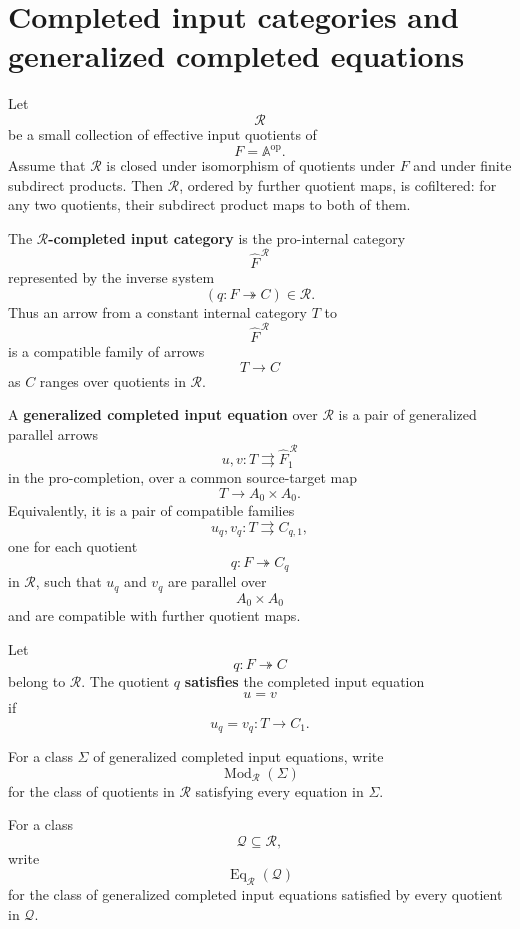 \section{Completed input categories and generalized completed equations}
\label{sec:eilenberg-completed-input-categories-equations}

Let
\[
\mathcal R
\]
be a small collection of effective input quotients of
\[
F=\mathbb A^{\mathrm{op}}.
\]
Assume that \(\mathcal R\) is closed under isomorphism of quotients under
\(F\) and under finite subdirect products. Then \(\mathcal R\), ordered by
further quotient maps, is cofiltered: for any two quotients, their subdirect
product maps to both of them.

\begin{definition}
\label{def:eilenberg-completed-input-category}
The \textbf{\(\mathcal R\)-completed input category} is the pro-internal
category
\[
\widehat F^{\,\mathcal R}
\]
represented by the inverse system
\[
(q:F\twoheadrightarrow C)\in\mathcal R.
\]
Thus an arrow from a constant internal category \(T\) to
\[
\widehat F^{\,\mathcal R}
\]
is a compatible family of arrows
\[
T\to C
\]
as \(C\) ranges over quotients in \(\mathcal R\).
\end{definition}

\begin{definition}
\label{def:eilenberg-completed-input-equation}
A \textbf{generalized completed input equation} over \(\mathcal R\) is a pair
of generalized parallel arrows
\[
u,v:T\rightrightarrows \widehat F^{\,\mathcal R}_1
\]
in the pro-completion, over a common source-target map
\[
T\to A_0\times A_0.
\]
Equivalently, it is a pair of compatible families
\[
u_q,v_q:T\rightrightarrows C_{q,1},
\]
one for each quotient
\[
q:F\twoheadrightarrow C_q
\]
in \(\mathcal R\), such that \(u_q\) and \(v_q\) are parallel over
\[
A_0\times A_0
\]
and are compatible with further quotient maps.
\end{definition}

\begin{definition}
\label{def:eilenberg-satisfaction-completed-equation}
Let
\[
q:F\twoheadrightarrow C
\]
belong to \(\mathcal R\). The quotient \(q\) \textbf{satisfies} the completed
input equation
\[
u=v
\]
if
\[
u_q=v_q:T\to C_1.
\]
\end{definition}

\begin{definition}
\label{def:eilenberg-models-equations}
For a class \(\Sigma\) of generalized completed input equations, write
\[
\operatorname{Mod}_{\mathcal R}(\Sigma)
\]
for the class of quotients in \(\mathcal R\) satisfying every equation in
\(\Sigma\).

For a class
\[
\mathcal Q\subseteq\mathcal R,
\]
write
\[
\operatorname{Eq}_{\mathcal R}(\mathcal Q)
\]
for the class of generalized completed input equations satisfied by every
quotient in \(\mathcal Q\).
\end{definition}

